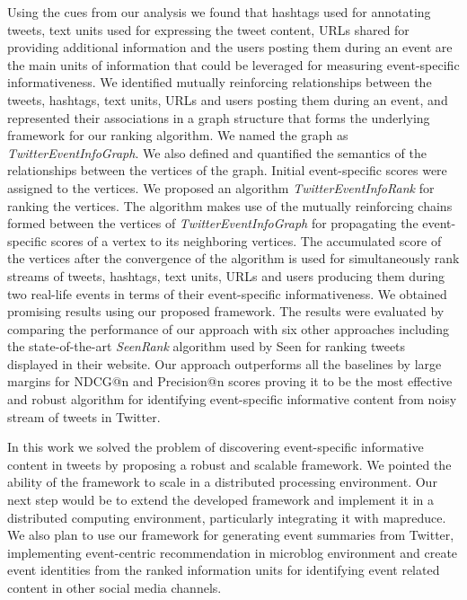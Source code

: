 Using the cues from our analysis we found that hashtags used for annotating tweets, text units used for expressing the tweet content, URLs shared for providing additional information and the users posting them during an event are the main units of information that could be leveraged for measuring event-specific informativeness.  We identified mutually reinforcing relationships between the tweets, hashtags, text units, URLs and users posting them during an event, and represented their associations in a graph structure that forms the underlying framework for our ranking algorithm. We named the graph as \textit{TwitterEventInfoGraph}. We also defined and quantified the semantics of the relationships between the vertices of the graph. Initial event-specific scores were assigned to the vertices. We proposed an algorithm \textit{TwitterEventInfoRank} for ranking the vertices. The algorithm makes use of the mutually reinforcing chains formed between the vertices of \textit{TwitterEventInfoGraph} for propagating the event-specific scores of a vertex to its neighboring vertices. The accumulated score of the vertices after the convergence of the algorithm is used for simultaneously rank streams of tweets, hashtags, text units, URLs and users producing them during two real-life events in terms of their event-specific informativeness. We obtained promising results using our proposed framework. The results were evaluated by comparing the performance of our approach with six other approaches including the state-of-the-art \textit{SeenRank} algorithm used by Seen for ranking tweets displayed in their website. Our approach outperforms all the baselines by large margins for NDCG@n and Precision@n scores proving it to be the most effective and robust algorithm for identifying event-specific informative content from noisy stream of tweets in Twitter.

In this work we solved the problem of discovering event-specific informative content in tweets by proposing a robust and scalable framework. We pointed the ability of the framework to scale in a distributed processing environment. Our next step would be to extend the developed framework and implement it in a distributed computing environment, particularly integrating it with mapreduce. We also plan to use our framework for generating event summaries from Twitter, implementing event-centric recommendation in microblog environment and create event identities from the ranked information units for identifying event related content in other social media channels.


